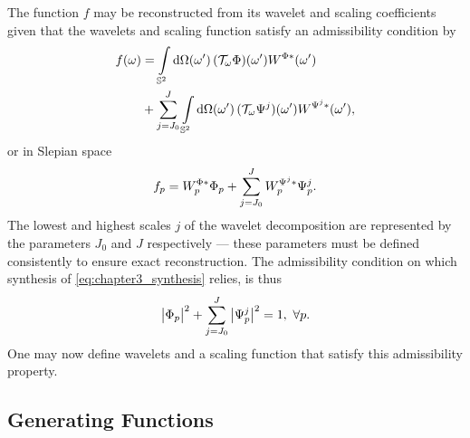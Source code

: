The function \(f\) may be reconstructed from its wavelet and scaling coefficients given that the wavelets and scaling function satisfy an admissibility condition by
%
\begin{align}\label{eq:chapter3_synthesis}
	\pixel{f}
	 & = \integrateSphere{\omega'} \pixel[']{(\translation{\omega}\Phi)} \pixel[']{W^{\Phi\ast}} \nonumber            \\
	 & + \waveletSum \integrateSphere{\omega'} \pixel[']{(\translation{\omega}\Psi^{j})} \pixel[']{W^{\Psi^{j}\ast}},
\end{align}
%
or in Slepian space
%
\begin{equation}
	\slepian{f}
	= \slepian{W}^{\Phi\ast} \slepian{\Phi}
	+ \waveletSum \slepian{W}^{\Psi^{j}\ast} \slepian{\Psi}^{j}.
\end{equation}
%
The lowest and highest scales \(j\) of the wavelet decomposition are represented by the parameters \(J_{0}\) and \(J\) respectively --- these parameters must be defined consistently to ensure exact reconstruction.
The admissibility condition on which synthesis of \cref{eq:chapter3_synthesis} relies, is thus
%
\begin{equation}\label{eq:chapter3_admissibility}
	\abs{\slepian{\Phi}}^{2}
	+ \waveletSum \abs{\slepian{\Psi}^{j}}^{2}
	= 1,\ \forall p.
\end{equation}
%
One may now define wavelets and a scaling function that satisfy this admissibility property.

\subsection{Generating Functions}\label{sec:chapter3_generating_functions}

